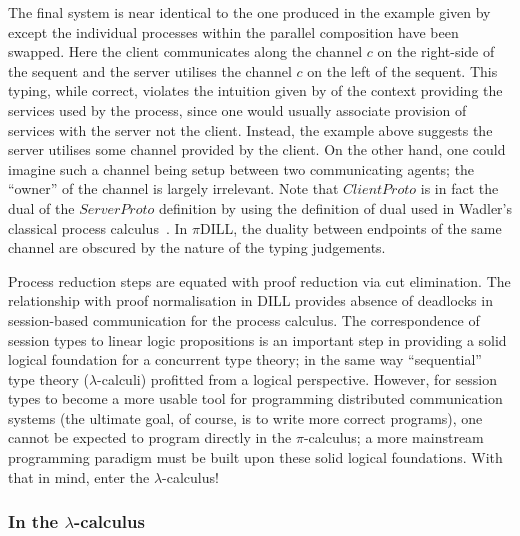 \documentclass{mpaper}
\begin{document}
The final system is near identical to the one produced in the example given by
\citeauthor{Caires:2010:STI} except the individual processes within the
parallel composition have been swapped. Here the client communicates along the
channel $c$ on the right-side of the sequent and the server utilises the
channel $c$ on the left of the sequent. This typing, while correct, violates
the intuition given by \citeauthor{Caires:2010:STI} of the context providing
the services used by the process, since one would usually associate provision
of services with the server not the client. Instead, the example above
suggests the server utilises some channel provided by the client. On the other
hand, one could imagine such a channel being setup between two communicating
agents; the ``owner'' of the channel is largely irrelevant. Note that
$ClientProto$ is in fact the dual of the $ServerProto$ definition by
\citeauthor{Caires:2010:STI} using the definition of dual used in Wadler's
classical process calculus~\cite{Wadler:2014}. In $\pi$DILL, the duality
between endpoints of the same channel are obscured by the nature of the typing
judgements.

Process reduction steps are equated with proof reduction via cut
elimination. The relationship with proof normalisation in DILL provides
absence of deadlocks in session-based communication for the process
calculus. The correspondence of session types to linear logic propositions is
an important step in providing a solid logical foundation for a concurrent
type theory; in the same way ``sequential'' type theory ($\lambda$-calculi)
profitted from a logical perspective. However, for session types to become a
more usable tool for programming distributed communication systems (the
ultimate goal, of course, is to write more correct programs), one cannot be
expected to program directly in the $\pi$-calculus; a more mainstream
programming paradigm must be built upon these solid logical foundations. With
that in mind, enter the $\lambda$-calculus!

\subsubsection{In the \texorpdfstring{$\lambda$}{lambda}-calculus}
\label{sec:lam}
\end{document}
